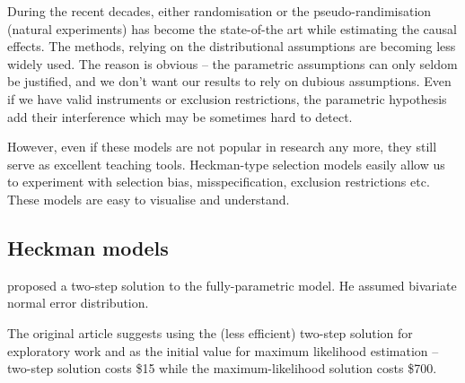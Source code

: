 During the recent decades, either randomisation or the
pseudo-randimisation (natural experiments) has become the state-of-the
art while estimating the causal effects.  The methods, relying on the
distributional assumptions are becoming less widely used.  The reason
is obvious -- the parametric assumptions can only seldom be justified,
and we don't want our results to rely on dubious assumptions.  Even if
we have valid instruments or exclusion restrictions, the parametric
hypothesis add their interference which may be sometimes hard to
detect.  

However, even if these models are not popular in research any more,
they still serve as excellent teaching tools.  Heckman-type selection
models easily allow us to experiment with selection bias,
misspecification, exclusion restrictions etc.  These models are easy
to visualise and understand.


\subsection{Heckman models}

\citet{heckman1976} proposed a two-step solution to the fully-parametric
model.  He assumed bivariate normal error distribution.

The original article suggests using the (less efficient) two-step
solution for exploratory work and as the initial value for maximum
likelihood estimation -- two-step solution costs \$15 while the
maximum-likelihood solution costs \$700.

